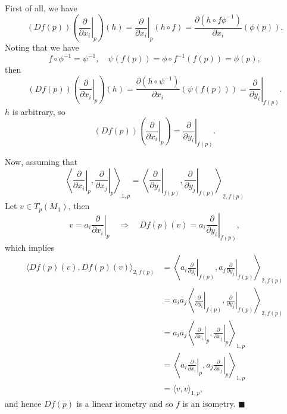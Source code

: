\documentclass[letter-paper]{tufte-book}
\newenvironment{proof}[1][Proof]{\begin{trivlist}
\item[\hskip \labelsep {\bfseries #1}]}{\end{trivlist}}
\newcommand{\qed}{\hfill$\blacksquare$}
\begin{document}
\begin{proof}
  First of all, we have
  \begin{equation*}
    (Df(p))\left(\left.\frac{\partial}{\partial x_i}\right|_p\right)(h) = \left.\frac{\partial}{\partial x_i}\right|_p (h\circ f) = \frac{\partial (h\circ f\phi^{-1})}{\partial x_i}(\phi(p)).
  \end{equation*}
  Noting that we have
  \begin{equation*}
    f\circ \phi^{-1} = \psi^{-1}, \quad \psi(f(p)) = \phi\circ f^{-1}(f(p)) = \phi(p),
  \end{equation*}
  then
  \begin{equation*}
    (Df(p))\left(\left.\frac{\partial}{\partial x_i}\right|_p\right)(h) = \frac{\partial (h\circ \psi^{-1})}{\partial x_i}(\psi(f(p))) = \left.\frac{\partial}{\partial y_i}\right|_{f(p)}.
  \end{equation*}
  $h$ is arbitrary, so
  \begin{equation*}
    (Df(p))\left(\left.\frac{\partial}{\partial x_i}\right|_p\right) = \left.\frac{\partial}{\partial y_i}\right|_{f(p)}.
  \end{equation*}
  
  Now, assuming that
  \begin{equation*}
    \left\langle \left.\frac{\partial}{\partial x_i}\right|_p, \left.\frac{\partial}{\partial x_j}\right|_p \right\rangle_{1,p} = \left\langle \left.\frac{\partial}{\partial y_i}\right|_{f(p)}, \left.\frac{\partial}{\partial y_j}\right|_{f(p)} \right\rangle_{2, f(p)}
  \end{equation*}
  Let $v \in T_p(M_1)$, then
  \begin{equation*}
    v = a_i \left.\frac{\partial}{\partial x_i}\right|_p \quad \Rightarrow \quad Df(p)(v) = a_i \left.\frac{\partial}{\partial y_i}\right|_{f(p)},
  \end{equation*}
  which implies
  \begin{align*}
    \langle Df(p)(v), Df(p)(v)\rangle_{2, f(p)} 
      &= \left\langle a_i \left.\frac{\partial}{\partial y_i}\right|_{f(p)}, a_j \left.\frac{\partial}{\partial y_j}\right|_{f(p)}\right\rangle_{2, f(p)}\\
      &= a_i a_j\left\langle \left.\frac{\partial}{\partial y_i}\right|_{f(p)}, \left.\frac{\partial}{\partial y_j}\right|_{f(p)}\right\rangle_{2, f(p)}\\
      &= a_i a_j\left\langle \left.\frac{\partial}{\partial x_i}\right|_p, \left.\frac{\partial}{\partial x_j}\right|_p\right\rangle_{1, p}\\
      &= \left\langle a_i \left.\frac{\partial}{\partial x_i}\right|_p, a_j\left.\frac{\partial}{\partial x_j}\right|_p\right\rangle_{1, p}\\
      &= \langle v, v\rangle_{1, p},
  \end{align*}
  and hence $Df(p)$ is a linear isometry and so $f$ is an isometry. \qed
\end{proof}
\end{document}
